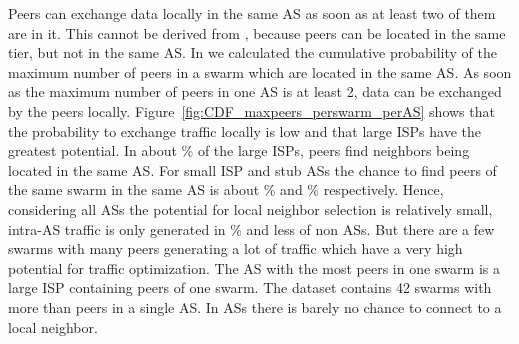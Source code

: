 


Peers can exchange data locally in the same AS as soon as at least two of them are in it. This cannot be derived from , because peers can be located in the same tier, but not in the same AS.
In  we calculated the cumulative probability of the maximum number of peers in a swarm which are located in the same AS. As soon as the maximum number of peers in one AS is at least 2, data can be exchanged by the peers locally. Figure~\ref{fig:CDF_maxpeers_perswarm_perAS} shows that the probability to exchange traffic locally is low and that large ISPs have the greatest potential. In about \unit[15]{\%} of the large ISPs, peers find neighbors being located in the same AS. For small ISP and stub ASs the chance to find peers of the same swarm in the same AS is about \unit[10]{\%} and \unit[12]{\%} respectively. Hence, considering all ASs the potential for local neighbor selection is relatively small, intra-AS traffic is only generated in \unit[15]{\%} and less of non \tier ASs. But there are a few swarms with many peers generating a lot of traffic which have a very high potential for traffic optimization. The AS with the most peers in one swarm is a large ISP containing  peers of one swarm. The dataset contains 42 swarms with more than  peers in a single AS.
In \tier ASs there is barely no chance to connect to a local neighbor.

